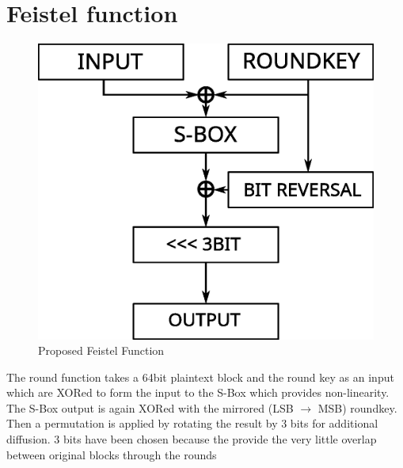 \documentclass[a4paper]{article}
\begin{document}
    \section{Feistel function}
        \begin{figure}[t]
	\centering
	\includegraphics[scale=.4]{roundfun.eps}
	\caption{Proposed Feistel Function}
	\label{fig:roundfun}
    \end{figure}
The round function takes a 64bit plaintext block and the round key as an input which are XORed to form the input to the S-Box which provides non-linearity. The S-Box output is again XORed with the mirrored (LSB $\rightarrow$ MSB) roundkey. Then a permutation is applied by rotating the result by 3 bits for additional diffusion. 3 bits have been chosen because the provide the very little overlap between original blocks through the rounds
\end{document}
